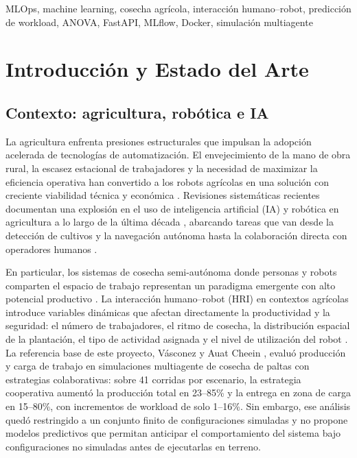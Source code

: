 \documentclass[conference]{IEEEtran}
\begin{document}
\begin{IEEEkeywords}
MLOps, machine learning, cosecha agrícola, interacción humano--robot, predicción de workload, ANOVA, FastAPI, MLflow, Docker, simulación multiagente
\end{IEEEkeywords}

\section{Introducción y Estado del Arte}

\subsection{Contexto: agricultura, robótica e IA}

La agricultura enfrenta presiones estructurales que impulsan la adopción acelerada de tecnologías de automatización. El envejecimiento de la mano de obra rural, la escasez estacional de trabajadores y la necesidad de maximizar la eficiencia operativa han convertido a los robots agrícolas en una solución con creciente viabilidad técnica y económica \cite{willekens2025}. Revisiones sistemáticas recientes documentan una explosión en el uso de inteligencia artificial (IA) y robótica en agricultura a lo largo de la última década \cite{hamrani2025,aijaz2025}, abarcando tareas que van desde la detección de cultivos y la navegación autónoma \cite{wakchaure2023} hasta la colaboración directa con operadores humanos \cite{adamides2023}.

En particular, los sistemas de cosecha semi-autónoma donde personas y robots comparten el espacio de trabajo representan un paradigma emergente con alto potencial productivo \cite{benos2023hri}. La interacción humano--robot (HRI) en contextos agrícolas introduce variables dinámicas que afectan directamente la productividad y la seguridad: el número de trabajadores, el ritmo de cosecha, la distribución espacial de la plantación, el tipo de actividad asignada y el nivel de utilización del robot \cite{guevara2024}. La referencia base de este proyecto, Vásconez y Auat Cheein \cite{vasconez2022}, evaluó producción y carga de trabajo en simulaciones multiagente de cosecha de paltas con estrategias colaborativas: sobre 41 corridas por escenario, la estrategia cooperativa aumentó la producción total en 23--85\% y la entrega en zona de carga en 15--80\%, con incrementos de workload de solo 1--16\%. Sin embargo, ese análisis quedó restringido a un conjunto finito de configuraciones simuladas y no propone modelos predictivos que permitan anticipar el comportamiento del sistema bajo configuraciones no simuladas antes de ejecutarlas en terreno.
\end{document}
